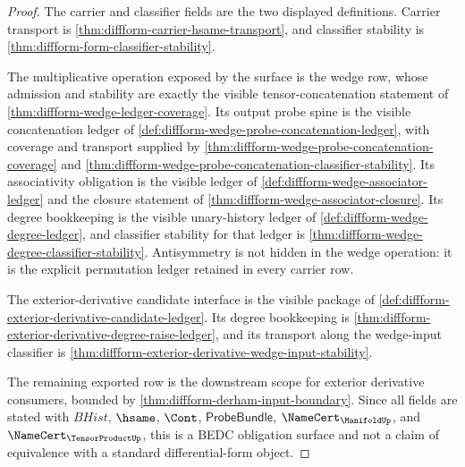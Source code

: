 \begin{proof}
The carrier and classifier fields are the two displayed definitions. Carrier
transport is \autoref{thm:diffform-carrier-hsame-transport}, and classifier
stability is \autoref{thm:diffform-form-classifier-stability}.

The multiplicative operation exposed by the surface is the wedge row, whose
admission and stability are exactly the visible tensor-concatenation statement
of \autoref{thm:diffform-wedge-ledger-coverage}. Its output probe spine is the
visible concatenation ledger of
\autoref{def:diffform-wedge-probe-concatenation-ledger}, with coverage and
transport supplied by
\autoref{thm:diffform-wedge-probe-concatenation-coverage} and
\autoref{thm:diffform-wedge-probe-concatenation-classifier-stability}. Its
associativity obligation is the visible ledger of
\autoref{def:diffform-wedge-associator-ledger} and the closure statement of
\autoref{thm:diffform-wedge-associator-closure}. Its degree bookkeeping is the
visible unary-history ledger of \autoref{def:diffform-wedge-degree-ledger},
and classifier stability for that ledger is
\autoref{thm:diffform-wedge-degree-classifier-stability}.
Antisymmetry is not hidden in the wedge operation: it is the explicit
permutation ledger retained in every carrier row.

The exterior-derivative candidate interface is the visible package of
\autoref{def:diffform-exterior-derivative-candidate-ledger}. Its degree
bookkeeping is
\autoref{thm:diffform-exterior-derivative-degree-raise-ledger}, and its
transport along the wedge-input classifier is
\autoref{thm:diffform-exterior-derivative-wedge-input-stability}.

The remaining exported row is the downstream scope for exterior derivative
consumers, bounded by \autoref{thm:diffform-derham-input-boundary}. Since all
fields are stated with $BHist$, $\hsame$, $\Cont$, $\mathsf{ProbeBundle}$,
$\NameCert_{\ManifoldUp}$, and $\NameCert_{\TensorProductUp}$, this is a BEDC
obligation surface and not a claim of equivalence with a standard
differential-form object.
\end{proof}

